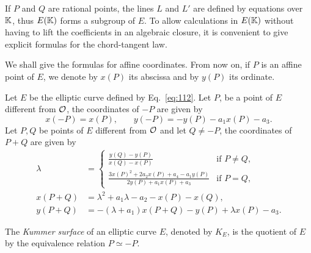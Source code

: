 If $P$ and $Q$ are rational points, the lines $L$ and $L'$ are defined
by equations over $\mathbb{K}$, thus $E(\mathbb{K})$ forms a subgroup of $E$. To allow
calculations in $E(\mathbb{K})$ without having to lift the coefficients in an
algebraic closure, it is convenient to give explicit formulas for the
chord-tangent law. 

We shall give the formulas for affine coordinates. From now on, if $P$
is an affine point of $E$, we denote by $x(P)$ its abscissa and by
$y(P)$ its ordinate.

\begin{proposition}
  Let $E$ be the elliptic curve defined by Eq.~\eqref{eq:112}. Let
  $P$, be a point of $E$ different from $\mathcal{O}$, the coordinates of $-P$
  are given by
  \begin{equation}
    \label{eq:120}
    x(-P) = x(P)\text{,}\qquad y(-P)=-y(P) -a_1x(P) - a_3
    \text{.}
  \end{equation}
  Let $P,Q$ be points of $E$ different from $\mathcal{O}$ and let $Q\ne-P$, the
  coordinates of $P+Q$ are given by
  \begin{equation}
    \label{eq:121}
    \begin{aligned}
      \lambda &= \begin{cases}
        \frac{y(Q) - y(P)}{x(Q) -x(P)} &\text{if $P\ne Q$,}\\
        \frac{3x(P)^2+2a_2x(P)+a_4-a_1y(P)}{2y(P)+a_1x(P)+a_3} &\text{if $P=Q$,}
      \end{cases}\\
      x(P+Q) &= \lambda^2+a_1\lambda-a_2-x(P)-x(Q)\text{,}\\
      y(P+Q) &= -(\lambda+a_1)x(P+Q) - y(P) + \lambda x(P)-a_3\text{.}
    \end{aligned}
  \end{equation}
\end{proposition}

\begin{definition}
  The \emph{Kummer surface} of an elliptic curve
  $E$, denoted by $K_E$, is the quotient of $E$ by the equivalence
  relation $P\simeq-P$.
\end{definition}

